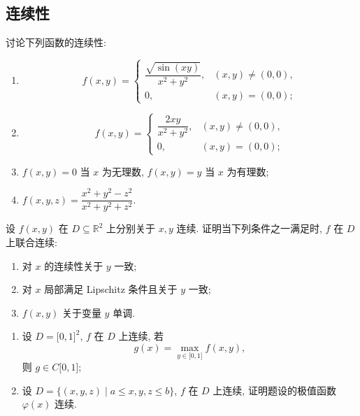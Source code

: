 \documentclass[../数学分析培优讲义.tex]{subfiles}
\begin{document}
\newpage

\subsection{连续性}

\begin{example}
讨论下列函数的连续性:
\begin{enumerate}[label=(\arabic*)]
    \item
    \[
        f(x,y)=
        \begin{cases}
            \dfrac{\sqrt{\sin(xy)}}{x^2+y^2}, & (x,y)\ne(0,0),\\
            0, & (x,y)=(0,0);
        \end{cases}
    \]
    \item
    \[
        f(x,y)=
        \begin{cases}
            \dfrac{2xy}{x^2+y^2}, & (x,y)\ne(0,0),\\
            0, & (x,y)=(0,0);
        \end{cases}
    \]
    \item $f(x,y)=0$ 当 $x$ 为无理数, $f(x,y)=y$ 当 $x$ 为有理数;
    \item $\displaystyle f(x,y,z)=\dfrac{x^2+y^2-z^2}{x^2+y^2+z^2}$.
\end{enumerate}
\end{example}
\exampleblank

\begin{example}[\markstar]
设 $f(x,y)$ 在 $D\subseteq\mathbb{R}^2$ 上分别关于 $x,y$ 连续. 证明当下列条件之一满足时, $f$ 在 $D$ 上联合连续:
\begin{enumerate}[label=(\arabic*)]
    \item 对 $x$ 的连续性关于 $y$ 一致;
    \item 对 $x$ 局部满足 Lipschitz 条件且关于 $y$ 一致;
    \item $f(x,y)$ 关于变量 $y$ 单调.
\end{enumerate}
\end{example}
\exampleblank

\begin{example}[\markstar]
\begin{enumerate}[label=(\arabic*)]
    \item 设 $D=\lbrack0,1\rbrack^2$, $f$ 在 $D$ 上连续, 若
    \[
        g(x)=\max_{y\in\lbrack0,1\rbrack}f(x,y),
    \]
    则 $g\in C\lbrack0,1\rbrack$;
    \item 设 $D=\{(x,y,z)\mid a\leq x,y,z\leq b\}$, $f$ 在 $D$ 上连续, 证明题设的极值函数 $\varphi(x)$ 连续.
\end{enumerate}
\end{example}
\exampleblank
\end{document}

